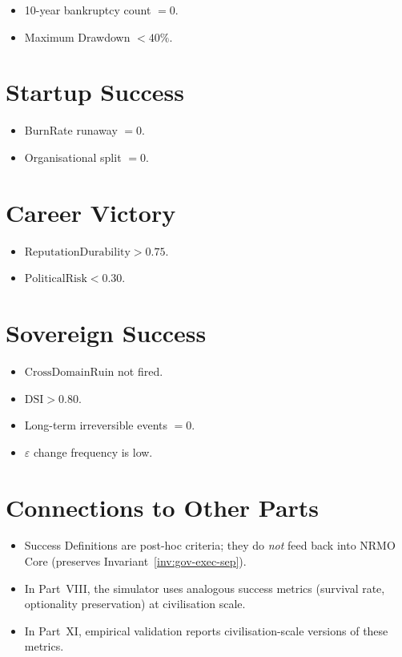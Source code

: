 \begin{itemize}
\item 10-year bankruptcy count $= 0$.
\item Maximum Drawdown $< 40\%$.
\end{itemize}

\section{Startup Success}
\label{sec:success-startup}

\begin{itemize}
\item BurnRate runaway $= 0$.
\item Organisational split $= 0$.
\end{itemize}

\section{Career Victory}
\label{sec:success-career}

\begin{itemize}
\item $\mathrm{ReputationDurability} > 0.75$.
\item $\mathrm{PoliticalRisk} < 0.30$.
\end{itemize}

\section{Sovereign Success}
\label{sec:success-sovereign}

\begin{itemize}
\item $\mathrm{CrossDomainRuin}$ not fired.
\item $\mathrm{DSI} > 0.80$.
\item Long-term irreversible events $= 0$.
\item $\varepsilon$ change frequency is low.
\end{itemize}

\section*{Connections to Other Parts}

\begin{itemize}
\item Success Definitions are post-hoc criteria; they do \emph{not}
feed back into NRMO Core (preserves
Invariant~\ref{inv:gov-exec-sep}).
\item In Part~VIII, the simulator uses analogous success metrics
(survival rate, optionality preservation) at civilisation scale.
\item In Part~XI, empirical validation reports civilisation-scale
versions of these metrics.
\end{itemize}
